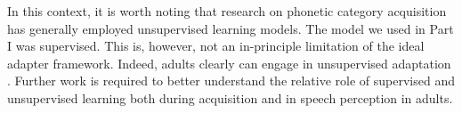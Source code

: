 In this context, it is worth noting that research on phonetic category acquisition has generally employed unsupervised learning models. The model we used in Part I was supervised. This is, however, not an in-principle limitation of the ideal adapter framework. Indeed, adults clearly can engage in unsupervised adaptation \cite{Clayards2008,Munson2011}. Further work is required to better understand the relative role of supervised and unsupervised learning \autocite[or the continuum between these extremes; e.g.,][]{Gibson2013,Zhu2007} both during acquisition and in speech perception in adults.


